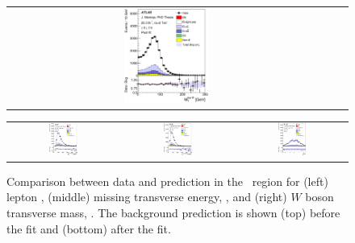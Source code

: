 \begin{figure}[tp]
\begin{tabular}{ccc}
  \includegraphics[width=0.27\textwidth]{Analysis/Figures_ttH/tesis_vars/postfit/WlepMT_6jetin2btagex.eps} \\
\end{tabular}
\caption{Comparison between data and prediction in the \sixtwo\ region for (left) lepton \pt,  (middle) missing transverse energy, \met, and (right)  $W$ boson transverse mass, \mtw. The background prediction is shown (top) before the fit and (bottom) after the fit.}
  \label{fig:vars1_sixtwo}
\vspace{0.5cm}
  \centering
  \begin{tabular}{ccc}
  \includegraphics[width=0.27\textwidth]{Analysis/Figures_ttH/tesis_vars/prefit/jet1_pt_6jetin2btagex.eps} &
  \includegraphics[width=0.27\textwidth]{Analysis/Figures_ttH/tesis_vars/prefit/bjet1_pt_6jetin2btagex.eps} &
  \includegraphics[width=0.27\textwidth]{Analysis/Figures_ttH/tesis_vars/prefit/lep_eta_6jetin2btagex.eps} \\

\end{tabular}
\end{figure}
